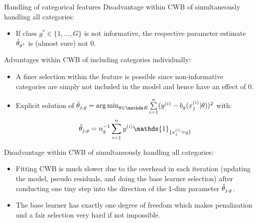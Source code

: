 \documentclass[11pt,compress,t,notes=noshow, xcolor=table]{beamer}
\begin{document}
\begin{vbframe}{Handling of categorical features}
Disadvantage within CWB of simultaneously handling all categories: 
\begin{itemize}
    \item 
        If class $g^\ast\in\{1, \dots, G\}$ is not informative, the respective parameter estimate $\hat{\theta}_{g^\ast}$ is (almost sure) not $0$.
\end{itemize}

\framebreak

Advantages within CWB of including categories individually: 
\begin{itemize}
    \item 
        A finer selection within the feature is possible since non-informative categories are simply not included in the model and hence have an effect of $0$.

    \item 
        Explicit solution of $\thetah_{j,g} = \argmin_{\theta\in\R}\sumin (\yi - b_g(x^{(i)}_j|\theta))^2$ with:
        $$\thetah_{j,g} = n_g^{-1}\sumin \yi \mathds{1}_{\{x^{(i)}_j = g\}}$$
\end{itemize}

Disadvantage within CWB of simultaneously handling all categories:
\begin{itemize}
    \item 
        Fitting CWB is much slower due to the overhead in each iteration (updating the model, pseudo residuals, and doing the base learner selection) after conducting one tiny step into the direction of the 1-dim parameter $\hat{\theta}_{j,g}$.

    \item 
        The base learner has exactly one degree of freedom which makes penalization and a fair selection very hard if not impossible.
\end{itemize}

\end{vbframe}

\end{document}
